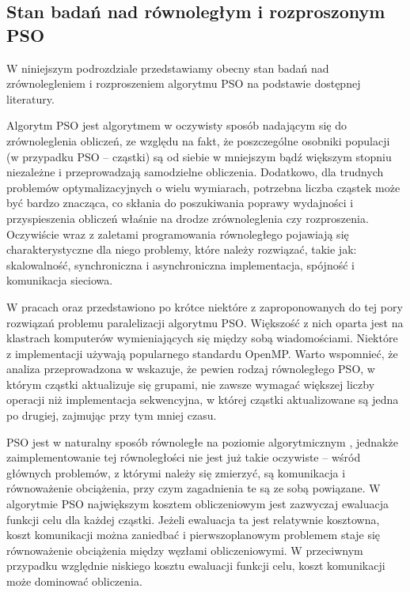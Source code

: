 \documentclass[12pt, twoside, openany, abstract=on]{report}
\theoremstyle{definition}
\begin{document}
\subsection{Stan badań nad równoległym i rozproszonym PSO}


W niniejszym podrozdziale przedstawiamy obecny stan badań nad zrównolegleniem i rozproszeniem algorytmu PSO na podstawie dostępnej literatury.

Algorytm PSO jest algorytmem w oczywisty sposób nadającym się do zrównoleglenia obliczeń, ze względu na fakt, że poszczególne osobniki populacji (w przypadku PSO – cząstki) 
 są od siebie w mniejszym bądź większym stopniu niezależne i przeprowadzają samodzielne obliczenia. Dodatkowo, dla trudnych problemów optymalizacyjnych o wielu wymiarach, potrzebna liczba cząstek może być bardzo znacząca, co skłania do poszukiwania poprawy wydajności i przyspieszenia obliczeń właśnie na drodze zrównoleglenia czy rozproszenia. 
Oczywiście wraz z zaletami programowania równoległego pojawiają się charakterystyczne dla niego problemy, które należy rozwiązać, takie jak: skalowalność, synchroniczna i asynchroniczna implementacja, spójność i komunikacja sieciowa. 

W pracach \cite{AccelParallelPso} oraz \cite{ComparisonParallelGpuPso} przedstawiono po krótce niektóre z zaproponowanych do tej pory rozwiązań problemu paralelizacji algorytmu PSO. Większość z nich oparta jest na klastrach komputerów wymieniających się między sobą wiadomościami.
Niektóre z implementacji używają popularnego standardu OpenMP. Warto wspomnieć, że analiza przeprowadzona w \cite{Pso8} wskazuje, że pewien rodzaj równoległego PSO, w którym cząstki aktualizuje się grupami, nie zawsze wymagać większej liczby operacji niż implementacja sekwencyjna, w której cząstki aktualizowane są jedna po drugiej, zajmując przy tym mniej czasu.

PSO jest w naturalny sposób równoległe na poziomie algorytmicznym 
, jednakże zaimplementowanie tej równoległości nie jest już takie oczywiste – wśród głównych problemów, z którymi należy się zmierzyć, są komunikacja %
 i równoważenie obciążenia, przy czym zagadnienia te są ze sobą powiązane. W algorytmie PSO największym kosztem obliczeniowym jest zazwyczaj ewaluacja funkcji celu dla każdej cząstki. Jeżeli ewaluacja ta jest relatywnie kosztowna, koszt komunikacji można zaniedbać i pierwszoplanowym problemem staje się równoważenie obciążenia między węzłami obliczeniowymi.
W przeciwnym przypadku względnie niskiego kosztu ewaluacji funkcji celu, koszt komunikacji może dominować obliczenia.
\end{document}
